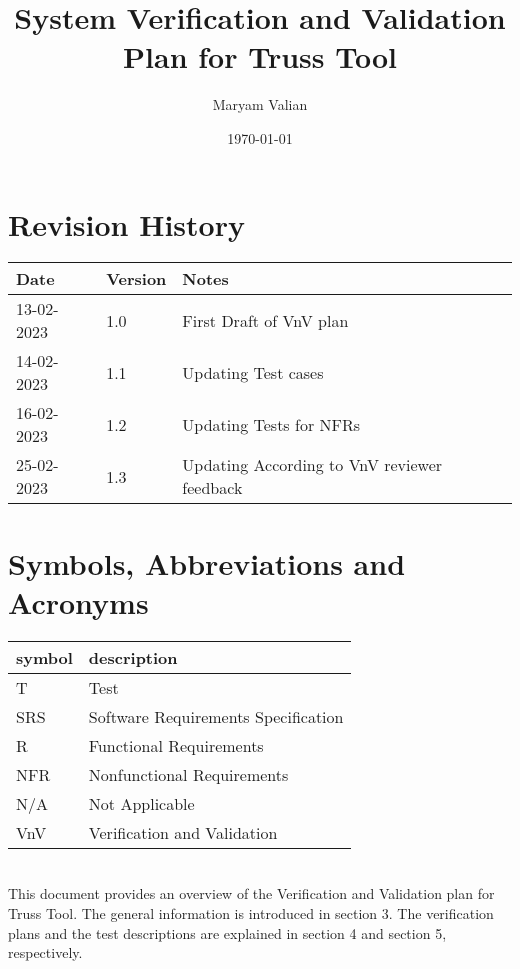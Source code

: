 \documentclass[12pt, titlepage]{article}
\begin{document}
\title{ System Verification and Validation Plan for Truss Tool} 
\author{Maryam Valian}
\date{\today}
	
\maketitle


\section{Revision History}

\begin{tabularx}{\textwidth}{p{3cm}p{2cm}X}
\toprule {\bf Date} & {\bf Version} & {\bf Notes}\\
\midrule
13-02-2023 & 1.0 & First Draft of VnV plan\\
14-02-2023 & 1.1& Updating Test cases   \\
16-02-2023 & 1.2& Updating Tests for NFRs   \\
25-02-2023 & 1.3& Updating According to VnV reviewer feedback   \\

\bottomrule
\end{tabularx}

\newpage

\tableofcontents

\newpage

\section{Symbols, Abbreviations and Acronyms}

\renewcommand{\arraystretch}{1.2}
\begin{tabular}{l l} 
  \toprule		
  \textbf{symbol} & \textbf{description}\\
  \midrule 
  T & Test\\
  SRS & Software Requirements Specification\\
  R & Functional Requirements\\
  NFR & Nonfunctional Requirements\\
  N/A & Not Applicable\\
  VnV & Verification and Validation\\
  
\bottomrule
\end{tabular}\\


\newpage
This document provides an overview of the Verification and Validation
 plan for Truss Tool. The general information is introduced in section 3. The verification plans and the test descriptions are explained in section 4 and section 5, respectively.
\end{document}
